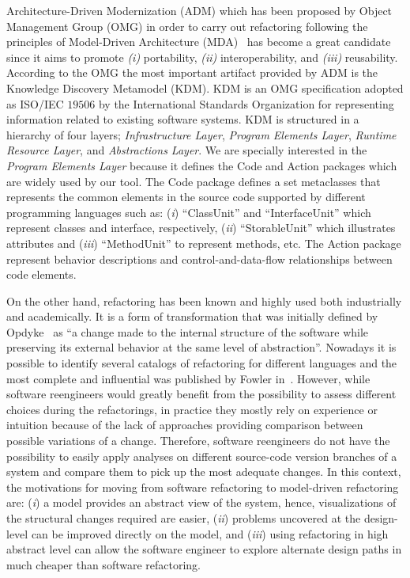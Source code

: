 Architecture-Driven Modernization (ADM) which has been proposed by Object Management Group (OMG) in order to carry out refactoring following the principles of Model-Driven Architecture (MDA)~\cite{Kleppe:2003} has become a great candidate since it aims to promote \textit{(i)} portability, \textit{(ii)} interoperability, and \textit{(iii)} reusability. According to the OMG the most important artifact provided by ADM is the Knowledge Discovery Metamodel (KDM). KDM is an OMG specification adopted as ISO/IEC $19506$ by the International Standards Organization for representing information related to existing software systems.  KDM is structured in a hierarchy of four layers; \textit{Infrastructure Layer}, \textit{Program Elements Layer}, \textit{ Runtime Resource Layer}, and \textit{Abstractions Layer}. We are specially interested in the \textit{Program Elements Layer} because it defines the Code and Action packages which are widely used by our tool. The Code package defines a set metaclasses that represents the common elements in the source code supported by different programming languages such as: (\textit{i}) ``ClassUnit'' and ``InterfaceUnit'' which represent classes and interface, respectively, (\textit{ii}) ``StorableUnit'' which illustrates attributes and (\textit{iii}) ``MethodUnit'' to represent methods, etc. The Action package represent behavior descriptions and control-and-data-flow relationships between code elements.

On the other hand, refactoring has been known and highly used both industrially and academically. It is a form of transformation that was initially defined by Opdyke~\cite{Opdy92b} as ``a change made to the internal structure of the software while preserving its external behavior at the same level of abstraction''. Nowadays it is possible to identify several catalogs of refactoring for different languages and the most complete and influential was published by Fowler in~\cite{refactImpro}. 
However, while software reengineers would greatly benefit from the possibility to assess different choices during the refactorings, in practice they mostly rely on experience or intuition because of the lack of approaches providing comparison between possible variations of a change. 
Therefore, software reengineers do not have the possibility to easily apply analyses on different source-code version branches of a system and compare them to pick up the most adequate changes. In this context, the motivations for moving from software refactoring  to model-driven refactoring are: 
(\textit{i}) a model provides an abstract view of the system, hence, visualizations of the structural changes required are easier, 
(\textit{ii}) problems uncovered at the design-level can be improved directly on the model, and 
(\textit{iii}) using refactoring in high abstract level can allow the software engineer to explore alternate design paths in much cheaper than software refactoring.

